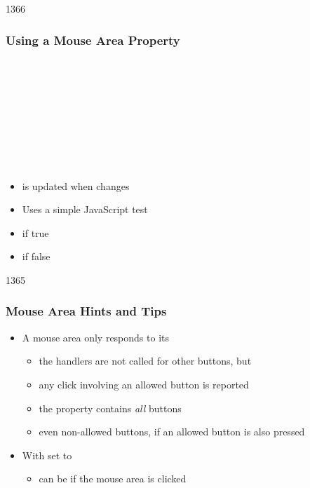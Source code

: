 \begin{slide}{1366}\frametitle{Using a Mouse Area Property}

\begin{qml}
\\
\\
\\
\vspace*{0.5em}
\\
\\
\\
\\
\\
\qtt{\}}
\end{qml}

\begin{itemize}
\item {} is updated when  changes
\item Uses a simple JavaScript test
\item {} if true
\item {} if false
\end{itemize}

\end{slide}


\begin{slide}{1365}\frametitle{Mouse Area Hints and Tips}

\begin{itemize}
\item A mouse area only responds to its 
  \begin{itemize}
  \item the handlers are not called for other buttons, but
  \item any click involving an allowed button is reported
  \item the  property contains \textit{all} buttons
  \item even non-allowed buttons, if an allowed button is also pressed
  \end{itemize}
\item With  set to 
  \begin{itemize}
  \item {} can be  if the mouse area
  is clicked
  \end{itemize}
\end{itemize}

\end{slide}

